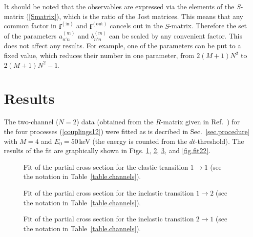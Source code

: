 \documentclass[12pt]{article}
\begin{document}
It should be noted that the observables are expressed via the elements of the
$S$-matrix (\ref{Smatrix}), which is the ratio of the Jost matrices. This means
that any common factor in $\bm{f}^{(\mathrm{in})}$ and
$\bm{f}^{(\mathrm{out})}$ cancels
out in the $S$-matrix. Therefore the set of the parameters $a^{(m)}_{n'n}$ and
$b^{(m)}_{n'n}$ can be scaled by any convenient factor. This does not affect
any results. For example, one of the parameters can be put to a fixed value,
which reduces their number in one parameter, from $2(M + 1)N^2$ to
$2(M + 1)N^2-1$.


\section{Results}
\label{sec.results}
The two-channel ($N=2$) data (obtained from the $R$-matrix given in
Ref.~\cite{PRL59}) for the four processes (\ref{couplings12}) were fitted as is
decribed in Sec.~\ref{sec.procedure} with $M=4$ and $E_0=50$\,keV (the
energy is counted from the $dt$-threshold). The results of the fit are
graphically shown in Figs. \ref{fig.fit11}, \ref{fig.fit12}, \ref{fig.fit21},
and \ref{fig.fit22}.

\begin{figure}
\centerline{}
\caption{\sf
Fit of the partial cross section for the elastic transition $1\to1$
(see the notation in Table~\ref{table.channels}).
}
\label{fig.fit11}
\end{figure}

\begin{figure}
\centerline{}
\caption{\sf
Fit of the partial cross section for the inelastic transition $1\to2$
(see the notation in Table~\ref{table.channels}).
}
\label{fig.fit12}
\end{figure}

\begin{figure}
\centerline{}
\caption{\sf
Fit of the partial cross section for the inelastic transition $2\to1$
(see the notation in Table~\ref{table.channels}).
}
\label{fig.fit21}
\end{figure}
\end{document}
